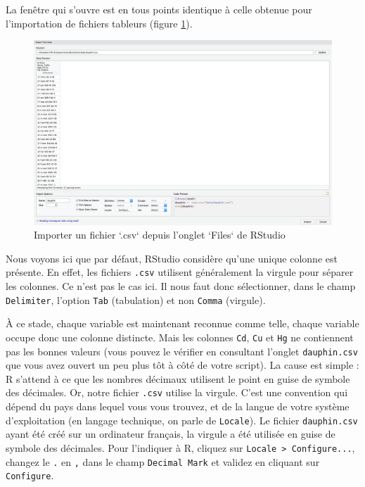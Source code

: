 \documentclass[
  a4paper,
]{article}
\begin{document}
La fenêtre qui s'ouvre est en tous points identique à celle obtenue pour l'importation de fichiers tableurs (figure \ref{fig:importcsv2}).

\begin{figure}[htpb]

{\centering \includegraphics[width=1\linewidth]{images/importcsv2} 

}

\caption{Importer un fichier `.csv` depuis l'onglet `Files` de RStudio}\label{fig:importcsv2}
\end{figure}

Nous voyons ici que par défaut, RStudio considère qu'une unique colonne est présente. En effet, les fichiers \texttt{.csv} utilisent généralement la virgule pour séparer les colonnes. Ce n'est pas le cas ici. Il nous faut donc sélectionner, dans le champ \texttt{Delimiter}, l'option \texttt{Tab} (tabulation) et non \texttt{Comma} (virgule).

À ce stade, chaque variable est maintenant reconnue comme telle, chaque variable occupe donc une colonne distincte. Mais les colonnes \texttt{Cd}, \texttt{Cu} et \texttt{Hg} ne contiennent pas les bonnes valeurs (vous pouvez le vérifier en consultant l'onglet \texttt{dauphin.csv} que vous avez ouvert un peu plus tôt à côté de votre script). La cause est simple : R s'attend à ce que les nombres décimaux utilisent le point en guise de symbole des décimales. Or, notre fichier \texttt{.csv} utilise la virgule. C'est une convention qui dépend du pays dans lequel vous vous trouvez, et de la langue de votre système d'exploitation (en langage technique, on parle de \texttt{Locale}). Le fichier \texttt{dauphin.csv} ayant été créé sur un ordinateur français, la virgule a été utilisée en guise de symbole des décimales. Pour l'indiquer à R, cliquez sur \texttt{Locale\ \textgreater{}\ Configure...}, changez le \texttt{.} en \texttt{,} dans le champ \texttt{Decimal\ Mark} et validez en cliquant sur \texttt{Configure}.
\end{document}
